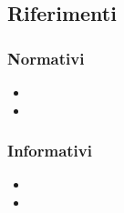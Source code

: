 \subsection{Riferimenti}
    \subsubsection{Normativi} %
        \begin{itemize}
            \item 
            \item 
        \end{itemize}
    \subsubsection{Informativi}
        \begin{itemize}%
            \item 
            \item 
        \end{itemize}
    